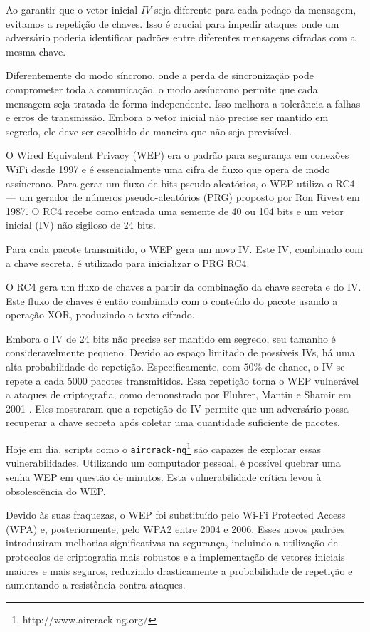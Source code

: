 Ao garantir que o vetor inicial $IV$ seja diferente para cada pedaço da mensagem, evitamos a repetição de chaves.
Isso é crucial para impedir ataques onde um adversário poderia identificar padrões entre diferentes mensagens cifradas com a mesma chave.

Diferentemente do modo síncrono, onde a perda de sincronização pode comprometer toda a comunicação, o modo assíncrono permite que cada mensagem seja tratada de forma independente.
Isso melhora a tolerância a falhas e erros de transmissão.
Embora o vetor inicial não precise ser mantido em segredo, ele deve ser escolhido de maneira que não seja previsível.


\begin{example}
  O Wired Equivalent Privacy (WEP) era o padrão para segurança em conexões WiFi desde 1997 e é essencialmente uma cifra de fluxo que opera de modo assíncrono.
  Para gerar um fluxo de bits pseudo-aleatórios, o WEP utiliza o RC4 \cite{Rivest16} — um gerador de números pseudo-aleatórios (PRG) proposto por Ron Rivest em 1987.
  O RC4 recebe como entrada uma semente de 40 ou 104 bits e um vetor inicial (IV) não sigiloso de 24 bits.

  Para cada pacote transmitido, o WEP gera um novo IV.
  Este IV, combinado com a chave secreta, é utilizado para inicializar o PRG RC4.

  O RC4 gera um fluxo de chaves a partir da combinação da chave secreta e do IV.
  Este fluxo de chaves é então combinado com o conteúdo do pacote usando a operação XOR, produzindo o texto cifrado.

  Embora o IV de 24 bits não precise ser mantido em segredo, seu tamanho é consideravelmente pequeno.
  Devido ao espaço limitado de possíveis IVs, há uma alta probabilidade de repetição.
  Especificamente, com $50\%$ de chance, o IV se repete a cada 5000 pacotes transmitidos.
  Essa repetição torna o WEP vulnerável a ataques de criptografia, como demonstrado por Fluhrer, Mantin e Shamir em 2001 \cite{Fluhrer01}.
  Eles mostraram que a repetição do IV permite que um adversário possa recuperar a chave secreta após coletar uma quantidade suficiente de pacotes.

  Hoje em dia, scripts como o {\tt aircrack-ng}\footnote{http://www.aircrack-ng.org/} são capazes de explorar essas vulnerabilidades.
  Utilizando um computador pessoal, é possível quebrar uma senha WEP em questão de minutos.
  Esta vulnerabilidade crítica levou à obsolescência do WEP.

  Devido às suas fraquezas, o WEP foi substituído pelo Wi-Fi Protected Access (WPA) e, posteriormente, pelo WPA2 entre 2004 e 2006.
  Esses novos padrões introduziram melhorias significativas na segurança, incluindo a utilização de protocolos de criptografia mais robustos e a implementação de vetores iniciais maiores e mais seguros, reduzindo drasticamente a probabilidade de repetição e aumentando a resistência contra ataques.

\end{example}

